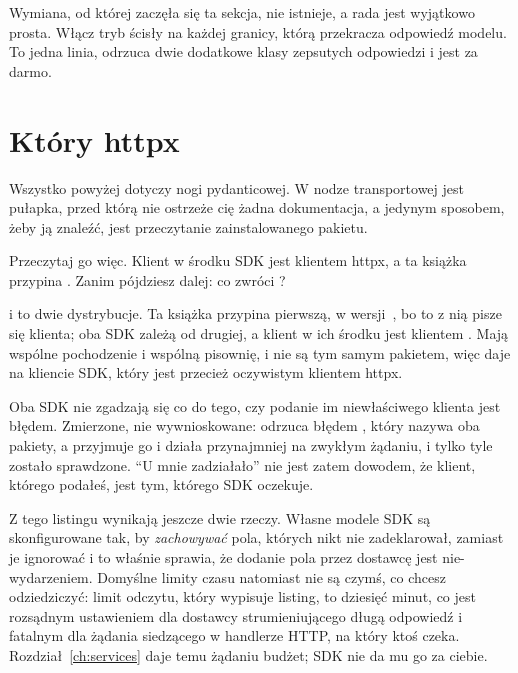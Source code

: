 Wymiana, od której zaczęła się ta sekcja, nie istnieje, a rada jest wyjątkowo
prosta. Włącz tryb ścisły na każdej granicy, którą przekracza odpowiedź
modelu. To jedna linia, odrzuca dwie dodatkowe klasy zepsutych odpowiedzi i
jest za darmo.

\section{Który httpx}
\label{sec:ai-which-httpx}

Wszystko powyżej dotyczy nogi pydanticowej. W nodze transportowej jest
pułapka, przed którą nie ostrzeże cię żadna dokumentacja, a jedynym sposobem,
żeby ją znaleźć, jest przeczytanie zainstalowanego pakietu.

Przeczytaj go więc. Klient w środku SDK jest klientem httpx, a ta książka
przypina . Zanim pójdziesz dalej: co zwróci
?



 i  to dwie dystrybucje. Ta książka przypina
pierwszą, w wersji~\httpxver, bo to z nią pisze się klienta; oba SDK zależą
od drugiej, a klient w ich środku jest klientem . Mają wspólne
pochodzenie i wspólną pisownię, i nie są tym samym pakietem, więc
 daje  na kliencie
SDK, który jest przecież oczywistym klientem httpx.

\begin{warning}
Oba SDK nie zgadzają się co do tego, czy podanie im niewłaściwego klienta
jest błędem. Zmierzone, nie wywnioskowane:  odrzuca
 błędem , który nazywa oba pakiety, a
 przyjmuje go i działa \dash{} przynajmniej na zwykłym żądaniu, i
tylko tyle zostało sprawdzone. \enquote{U mnie zadziałało} nie jest zatem
dowodem, że klient, którego podałeś, jest tym, którego SDK oczekuje.
\end{warning}

Z tego listingu wynikają jeszcze dwie rzeczy. Własne modele SDK są
skonfigurowane tak, by \emph{zachowywać} pola, których nikt nie
zadeklarował, zamiast je ignorować \dash{} i to właśnie sprawia, że dodanie
pola przez dostawcę jest nie-wydarzeniem. Domyślne limity czasu natomiast nie
są czymś, co chcesz odziedziczyć: limit odczytu, który wypisuje listing, to
dziesięć minut, co jest rozsądnym ustawieniem dla dostawcy strumieniującego długą odpowiedź i
fatalnym dla żądania siedzącego w handlerze HTTP, na który ktoś czeka.
Rozdział~\ref{ch:services} daje temu żądaniu budżet; SDK nie da mu go za
ciebie.

